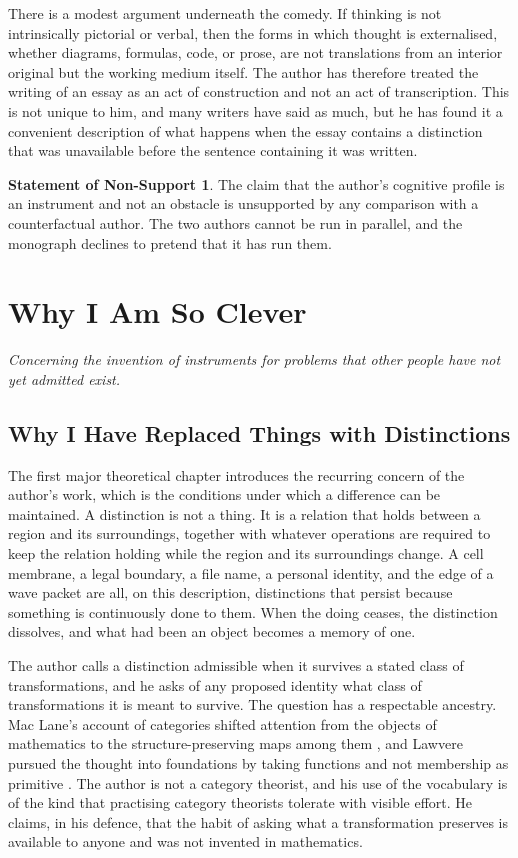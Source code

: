 \documentclass[11pt,openany,twoside]{book}
\theoremstyle{plain}
\theoremstyle{definition}
\newtheorem{nonsupport}{Statement of Non-Support}
\theoremstyle{remark}
\begin{document}
There is a modest argument underneath the comedy. If thinking is not intrinsically pictorial or verbal, then the forms in which thought is externalised, whether diagrams, formulas, code, or prose, are not translations from an interior original but the working medium itself. The author has therefore treated the writing of an essay as an act of construction and not an act of transcription. This is not unique to him, and many writers have said as much, but he has found it a convenient description of what happens when the essay contains a distinction that was unavailable before the sentence containing it was written.

\begin{nonsupport}
The claim that the author's cognitive profile is an instrument and not an obstacle is unsupported by any comparison with a counterfactual author. The two authors cannot be run in parallel, and the monograph declines to pretend that it has run them.
\end{nonsupport}

\part{Why I Am So Clever}

\begin{center}\emph{Concerning the invention of instruments for problems that other people have not yet admitted exist.}\end{center}

\chapter{Why I Have Replaced Things with Distinctions}

The first major theoretical chapter introduces the recurring concern of the author's work, which is the conditions under which a difference can be maintained. A distinction is not a thing. It is a relation that holds between a region and its surroundings, together with whatever operations are required to keep the relation holding while the region and its surroundings change. A cell membrane, a legal boundary, a file name, a personal identity, and the edge of a wave packet are all, on this description, distinctions that persist because something is continuously done to them. When the doing ceases, the distinction dissolves, and what had been an object becomes a memory of one.

The author calls a distinction admissible when it survives a stated class of transformations, and he asks of any proposed identity what class of transformations it is meant to survive. The question has a respectable ancestry. Mac Lane's account of categories shifted attention from the objects of mathematics to the structure-preserving maps among them \cite{maclane-categories}, and Lawvere pursued the thought into foundations by taking functions and not membership as primitive \cite{lawvere-etcs}. The author is not a category theorist, and his use of the vocabulary is of the kind that practising category theorists tolerate with visible effort. He claims, in his defence, that the habit of asking what a transformation preserves is available to anyone and was not invented in mathematics.
\end{document}

